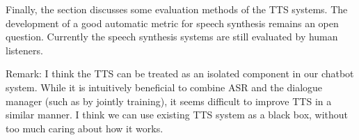 Finally, the section discusses some evaluation methods of the TTS systems. The development of a good automatic metric for speech synthesis remains an open question. Currently the speech synthesis systems are still evaluated by human listeners.

Remark: I think the TTS can be treated as an isolated component in our chatbot system. While it is intuitively beneficial to combine ASR and the dialogue manager (such as by jointly training), it seems difficult to improve TTS in a similar manner. I think we can use existing TTS system as a black box, without too much caring about how it works. 